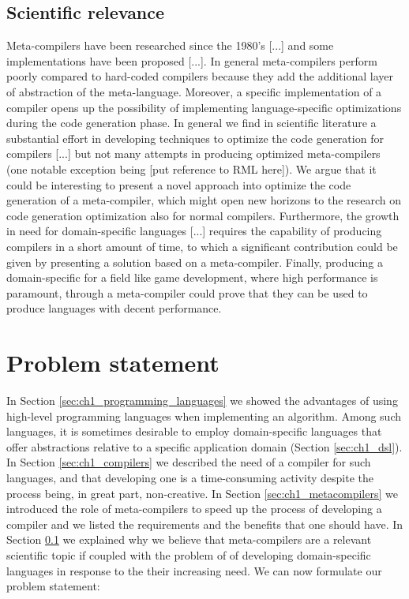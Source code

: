 \subsection{Scientific relevance} %
\label{sec:ch1_scientific_relevance}
Meta-compilers have been researched since the 1980's [...] and some implementations have been proposed [...]. In general meta-compilers perform poorly compared to hard-coded compilers because they add the additional layer of abstraction of the meta-language. Moreover, a specific implementation of a compiler opens up the possibility of implementing language-specific optimizations during the code generation phase. In general we find in scientific literature a substantial effort in developing techniques to optimize the code generation for compilers [...] but not many attempts in producing optimized meta-compilers (one notable exception being [put reference to RML here]). We argue that it could be interesting to present a novel approach into optimize the code generation of a meta-compiler, which might open new horizons to the research on code generation optimization also for normal compilers. Furthermore, the growth in need for domain-specific languages [...] requires the capability of producing compilers in a short amount of time, to which a significant contribution could be given by presenting a solution based on a meta-compiler. Finally, producing a domain-specific for a field like game development, where high performance is paramount, through a meta-compiler could prove that they can be used to produce languages with decent performance.

\section{Problem statement}
\label{sec:ch1_problem_statement}
In Section \ref{sec:ch1_programming_languages} we showed the advantages of using high-level programming languages when implementing an algorithm. Among such languages, it is sometimes desirable to employ domain-specific languages that offer abstractions relative to a specific application domain (Section \ref{sec:ch1_dsl}). In Section \ref{sec:ch1_compilers} we described the need of a compiler for such languages, and that developing one is a time-consuming activity despite the process being, in great part, non-creative. In Section \ref{sec:ch1_metacompilers} we introduced the role of meta-compilers to speed up the process of developing a compiler and we listed the requirements and the benefits that one should have. In Section \ref{sec:ch1_scientific_relevance} we explained why we believe that meta-compilers are a relevant scientific topic if coupled with the problem of of developing domain-specific languages in response to the their increasing need. We can now formulate our problem statement:

